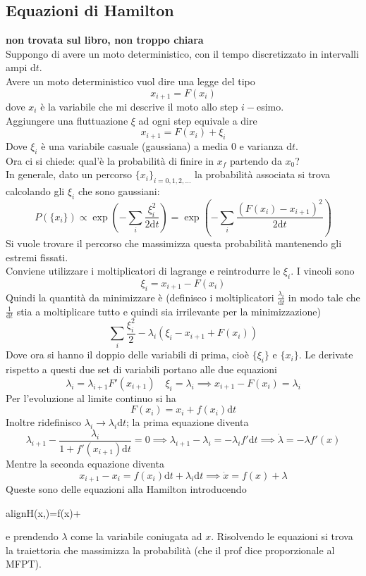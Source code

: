 \documentclass[a4paper,12pt]{article}
\newcommand{\boxedeq}[2]{\begin{empheq}[box={\fboxsep=6pt\fbox}]{align}\label{#1}#2\end{empheq}}
\theoremstyle{plain}
\theoremstyle{definition}
\newcommand{\f}[2]{\frac{#1}{#2}}
\renewcommand{\d}{\text{d}}
\newcommand{\ra}{\rightarrow}
\theoremstyle{remark}
\begin{document}
\subsection{Equazioni di Hamilton}
\textbf{non trovata sul libro, non troppo chiara}\\
Suppongo di avere un moto deterministico, con il tempo discretizzato in intervalli ampi $\d t$. \\ Avere un moto deterministico vuol dire una legge del tipo
\[x_{i+1}=F(x_i)\]
dove $x_i$ è la variabile che mi descrive il moto allo step $i-$esimo.\\Aggiungere una fluttuazione $\xi$ ad ogni step equivale a dire
\[x_{i+1}= F(x_i)+\xi_i			\]
Dove $\xi_i$ è una variabile casuale (gaussiana) a media $0$ e varianza $\d t$.
\\Ora ci si chiede: qual'è la probabilità di finire in	$x_f$ partendo da $x_0$?
\\In generale, dato un percorso $\{x_i\}_{i=0,1,2,\ldots}$ la probabilità associata si trova calcolando gli $\xi_i$  che sono gaussiani:
\[P(\{x_i\})\propto	\exp(-\sum_i\f{\xi_i^2}{2\d t})	=	\exp(-\sum_i\f{(F(x_i)-x_{i+1})^2}{2\d t})\] 
Si vuole trovare il percorso che massimizza questa probabilità mantenendo gli estremi fissati.\\ Conviene utilizzare i moltiplicatori di lagrange e reintrodurre le $\xi_i$. I vincoli sono
\[\xi_i=x_{i+1}-F(x_i)\]
Quindi la quantità da minimizzare è (definisco i moltiplicatori $ \f{\lambda_i}{\d t}$ in modo tale che $\f{1}{\d t}$ stia a moltiplicare tutto e quindi sia irrilevante per la minimizzazione)
\[\sum_i \f{\xi_i^2}{2}	-	\lambda_i (\xi_i-x_{i+1}+F(x_i))		\]
Dove ora si hanno il doppio delle variabili di prima, cioè $\{{\xi_i}\}$ e $\{x_i\}$. Le derivate rispetto a questi due set di variabili portano alle due equazioni
\[ \lambda_{i}=\lambda_{i+1} F'(x_{i+1})\quad	\xi_i=\lambda_i\implies x_{i+1}-F(x_i)=\lambda_i	\]
Per l'evoluzione al limite continuo si ha
\[F(x_i)=x_i+f(x_i)\d t		\]
Inoltre ridefinisco $\lambda_i\ra {\lambda_i}{\d t}$; la prima equazione diventa
\[\lambda_{i+1}-\f{\lambda_i}{1+f'(x_{i+1})\d t}=0\implies	\lambda_{i+1}-\lambda_i=-\lambda_i f' \d t\implies \dot{\lambda}=-\lambda f'(x)	\]
Mentre la seconda equazione diventa
\[x_{i+1}-x_i=f(x_i)\d t+	\lambda_i \d t \implies \dot{x}=f(x)+\lambda\]
Queste sono delle equazioni alla Hamilton introducendo
\boxedeq{Hami}{H(x,\lambda)=f(x)\lambda+\f{\lambda^2}{2}}
e prendendo $\lambda$ come la variabile coniugata ad $x$. Risolvendo le equazioni si trova la traiettoria che massimizza la probabilità (che il prof dice proporzionale al MFPT).
\end{document}
